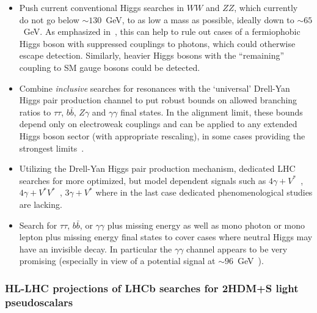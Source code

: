 \documentclass[../report.tex]{subfiles}
\providecommand{\main}{..}
\begin{document}
\begin{itemize}
\item Push current conventional Higgs searches in $WW$ and $ZZ$, which
  currently~\cite{Khachatryan:2015cwa,Sirunyan:2018qlb} do not go below
  $\sim 130$~GeV, to as low a mass as possible, ideally down to $\sim
  65$~GeV. As emphasized in~\cite{Delgado:2016arn,Vega:2018ddp}, this
  can help to rule out cases of a fermiophobic Higgs boson with
  suppressed couplings to photons, which could otherwise escape
  detection. Similarly, heavier Higgs bosons with the ``remaining''
  coupling to SM gauge bosons could be detected.

\item Combine \emph{inclusive} searches for resonances with the
  `universal' Drell-Yan Higgs pair production channel to put robust
  bounds on allowed branching ratios to $\tau\tau$, $b\bar{b}$, $Z\gamma$ and
  $\gamma\gamma$ final states. In the alignment limit,
  these bounds depend only on electroweak couplings and can be applied
  to any extended Higgs boson sector (with appropriate rescaling), in
  some cases providing the strongest limits~\cite{Delgado:2016arn,Vega:2018ddp}.

\item Utilizing the Drell-Yan Higgs pair production mechanism, dedicated
  LHC searches for more optimized, but model dependent signals such as
  $4\gamma + V^\ast$~\cite{Akeroyd:2003bt,Aaltonen:2016fnw,Arhrib:2017wmo},
  $4\gamma + V^\ast V^\ast$~\cite{Akeroyd:2003bt}, $3\gamma +
  V^\ast$ where in the last case dedicated phenomenological studies are
  lacking. 

\item Search for $\tau\tau$, $b\bar{b}$, or $\gamma\gamma$ plus missing
  energy as well as mono photon or mono lepton plus missing energy final
  states to cover cases where neutral Higgs may have an invisible
  decay. In particular the $\gamma\gamma$ channel appears to be
  very promising (especially in view of a potential signal at 
  $\sim 96$~GeV~\cite{CMS-PAS-HIG-17-013}).
 
\end{itemize}






\subsubsection{HL-LHC projections of LHCb searches for 2HDM+S light pseudoscalars}\label{Sec:9.8LHCb}






%
\end{document}
